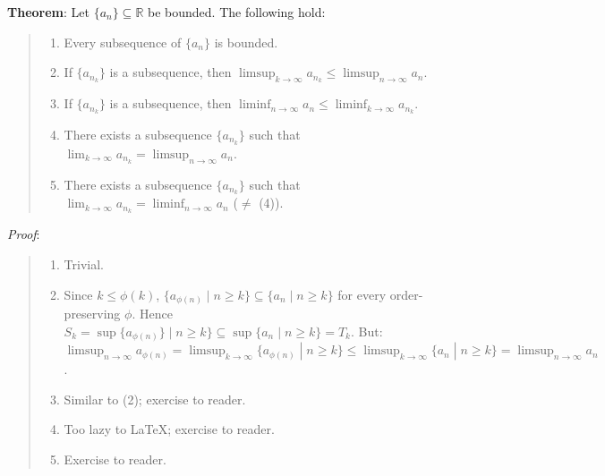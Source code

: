 \documentclass[11pt]{article}
\begin{document}
\textbf{Theorem}: Let $\{a_n\} \subseteq \mathbb{R}$ be bounded. The following hold:
\begin{quote}\vspace{-0.3cm}
	\begin{enumerate}
	\item Every subsequence of $\{a_n\}$ is bounded.
	\item If $\{a_{n_k}\}$ is a subsequence, then $\limsup_{k \to \infty} a_{n_k} \leq \limsup_{n \to \infty} a_n$.
	\item If $\{a_{n_k}\}$ is a subsequence, then $\liminf_{n \to \infty} a_n \leq \liminf_{k \to \infty} a_{n_k}$.
	\item There exists a subsequence $\{a_{n_k}\}$ such that $\lim_{k \to \infty} a_{n_k} = \limsup_{n \to \infty} a_n$.
	\item There exists a subsequence $\{a_{n_k}\}$ such that $\lim_{k \to \infty} a_{n_k} = \liminf_{n \to \infty} a_n$ ($\neq$ (4)).
	\end{enumerate}
\end{quote}

\emph{Proof}:
\begin{quote}\vspace{-0.3cm}
	\begin{enumerate}
	\item Trivial.
	\item Since $k \leq \phi(k)$, $\{a_{\phi(n)} \;|\; n \geq k\} \subseteq \{a_n \;|\; n \geq k\}$ for every order-preserving $\phi$. Hence $S_k = \sup \{a_{\phi(n)}\} \;|\; n \geq k\} \subseteq \sup \{a_n \;|\; n \geq k\} = T_k$. But:\\
	$\limsup_{n \to \infty} a_{\phi(n)} = \limsup_{k \to \infty} \{a_{\phi(n)} \;|\; n \geq k\} \leq \limsup_{k \to \infty} \{a_n \;|\; n \geq k\} = \limsup_{n \to \infty} a_n$.
	\item Similar to (2); exercise to reader.
	\item Too lazy to \LaTeX; exercise to reader. %
	\item Exercise to reader.
	\end{enumerate}
\end{quote}
\end{document}
